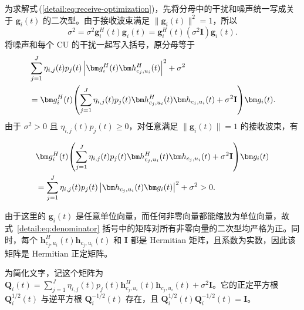 为求解式\,(\ref{detail:eq:receive-optimization})，先将分母中的干扰和噪声统一写成关于 $\bm g_i(t)$ 的二次型。由于接收波束满足 $\|\bm g_i(t)\|^2=1$，所以
\begin{equation}
\sigma^2=\sigma^2\bm g_i^H(t)\bm g_i(t)
=\bm g_i^H(t)(\sigma^2\mathbf I)\bm g_i(t).
\end{equation}
将噪声和每个 CU 的干扰一起写入括号，原分母等于
\begin{align}\label{detail:eq:denominator}
&\sum_{j=1}^J\eta_{i,j}(t)p_j(t)
\left|\bm g_i^H(t)\bm h_{c_j,u_i}^{H}(t)\right|^2+\sigma^2\notag\\
&=\bm g_i^H(t)\!\left(\sum_{j=1}^J\eta_{i,j}(t)p_j(t)
\bm h_{c_j,u_i}^{H}(t)\bm h_{c_j,u_i}(t)+\sigma^2\mathbf I\right)\!\bm g_i(t).
\end{align}
由于 $\sigma^2>0$ 且 $\eta_{i,j}(t)p_j(t)\ge0$，对任意满足 $\|\bm g_i(t)\|=1$ 的接收波束，有
\begin{samepage}
\begin{align}
&\bm g_i^H(t)\!\left(\sum_{j=1}^J\eta_{i,j}(t)p_j(t)
\bm h_{c_j,u_i}^{H}(t)\bm h_{c_j,u_i}(t)+\sigma^2\mathbf I\right)\!\bm g_i(t)\notag\\
&=\sum_{j=1}^J\eta_{i,j}(t)p_j(t)
\left|\bm h_{c_j,u_i}(t)\bm g_i(t)\right|^2+\sigma^2>0.
\end{align}
\end{samepage}
由于这里的 $\bm g_i(t)$ 是任意单位向量，而任何非零向量都能缩放为单位向量，故式~\eqref{detail:eq:denominator} 括号中的矩阵对所有非零向量的二次型均严格为正。同时，每个 $\bm h_{c_j,u_i}^{H}(t)\bm h_{c_j,u_i}(t)$ 和 $\mathbf I$ 都是 Hermitian 矩阵，且系数为实数，因此该矩阵是 Hermitian 正定矩阵。

为简化文字，记这个矩阵为 $\mathbf Q_i(t)=\sum_{j=1}^{J}\eta_{i,j}(t)p_j(t)\bm h_{c_j,u_i}^{H}(t)\bm h_{c_j,u_i}(t)+\sigma^2\mathbf I$。它的正定平方根 $\mathbf Q_i^{1/2}(t)$ 与逆平方根 $\mathbf Q_i^{-1/2}(t)$ 存在，且 $\mathbf Q_i^{1/2}(t)\mathbf Q_i^{-1/2}(t)=\mathbf I$。

